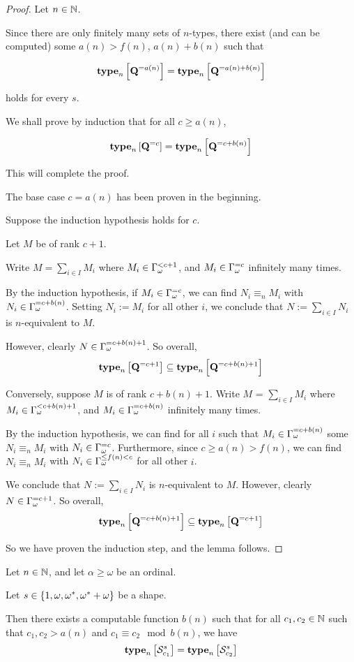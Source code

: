 \begin{proof}
  Let $n \in \mathbb{N}$.

  Since there are only finitely many sets of $n$-types,
  there exist (and can be computed)
  some $a(n) > f(n)$, $a(n) + b(n)$ such that

  \[\mathbf{type}_{n} \left[ {\mathbf{Q}^{= a(n)}} \right] = \mathbf{type}_{n} \left[ {\mathbf{Q}^{= a(n) + b(n)}} \right]\]

  holds for every $s$.

  We shall prove by induction that for all $c \ge a(n)$,

  \[\mathbf{type}_{n} \left[ {\mathbf{Q}^{= c}} \right] = \mathbf{type}_{n} \left[ {\mathbf{Q}^{= c + b(n)}} \right]\]

  This will complete the proof.

  The base case $c = a(n)$ has been proven in the beginning.

  Suppose the induction hypothesis holds for $c$.

  Let $M$ be of rank $c + 1$.

  Write $M = \sum_{i \in I} M_i$ where $M_i \in \Gamma_{\omega}^{< c + 1}$,
  and $M_i \in \Gamma_{\omega}^{= c}$ infinitely many times.

  By the induction hypothesis,
  if $M_i \in \Gamma_{\omega}^{= c}$, we can find $N_i \equiv_n M_i$ with $N_i \in \Gamma_{\omega}^{= c + b(n)}$.
  Setting $N_i := M_i$ for all other $i$, we conclude that $N := \sum_{i \in I} N_i$
  is $n$-equivalent to $M$.

  However, clearly $N \in \Gamma_{\omega}^{= c + b(n) + 1}$. So overall,
  \[\mathbf{type}_{n} \left[ {\mathbf{Q}^{= c + 1}} \right] \subseteq \mathbf{type}_{n} \left[ {\mathbf{Q}^{= c + b(n) + 1}} \right]\]

  Conversely, suppose $M$ is of rank $c + b(n) + 1$.
  Write $M$ = $\sum_{i \in I} M_i$ where $M_i \in \Gamma_{\omega}^{< c + b(n) + 1}$,
  and $M_i \in \Gamma_{\omega}^{= c + b(n)}$ infinitely many times.

  By the induction hypothesis,
  we can find for all $i$ such that $M_i \in \Gamma_{\omega}^{= c + b(n)}$ some
  $N_i \equiv_n M_i$ with $N_i \in \Gamma_{\omega}^{= c}$.
  Furthermore, since $c \ge a(n) > f(n)$, we can
  find $N_i \equiv_n M_i$ with $N_i \in \Gamma_{\omega}^{\le f(n) < c}$ for all other $i$.

  We conclude that $N := \sum_{i \in I} N_i$ is $n$-equivalent to $M$.
  However, clearly $N \in \Gamma_{\omega}^{= c + 1}$. So overall,
  \[\mathbf{type}_{n} \left[ {\mathbf{Q}^{= c + b(n) + 1}} \right] \subseteq \mathbf{type}_{n} \left[ {\mathbf{Q}^{= c + 1}} \right]\]

  So we have proven the induction step, and the lemma follows.
\end{proof}

\begin{corollary}
  Let $n \in \mathbb{N}$, and let $\alpha \ge \omega$ be an ordinal.

  Let $s \in \left\{ {1, \omega, \omega^\ast, \omega^\ast + \omega} \right\}$ be a shape.

  Then there exists a computable function $b(n)$ such that
  for all $c_1, c_2 \in \mathbb{N}$ such that $c_1, c_2 > a(n)$ and $c_1 \equiv c_2 \mod b(n)$,
  we have
  \[\mathbf{type}_{n} \left[ {\mathcal{S}^{s}_{c_1}} \right] = \mathbf{type}_{n} \left[ {\mathcal{S}^{s}_{c_2}} \right]\]
\end{corollary}

